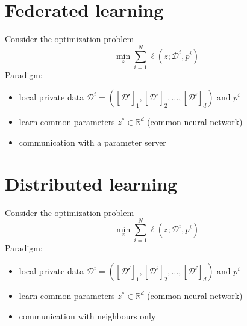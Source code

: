 \documentclass{book}
\newcommand{\R}{\mathbb{R}}
\theoremstyle{theoremv2}
\theoremstyle{defv2}
\theoremstyle{remark}
\theoremstyle{remark}
\theoremstyle{definition}
\theoremstyle{definition}
\begin{document}
\section{Federated learning}
Consider the optimization problem 
\[
    \min_z \displaystyle\sum_{i=1}^{N}\ell(z;\mathcal{D}^i,p^i)
\]
Paradigm:
\begin{itemize}
    \item local private data $\mathcal{D}^i = ([\mathcal{D^i}]_1,[\mathcal{D^i}]_2,\dots,[\mathcal{D^i}]_d)$ and $p^i$
    \item learn common parameters $z^*\in\R^d$ (common neural network)
    \item communication with a parameter server
\end{itemize}

\section{Distributed learning}
Consider the optimization problem 
\[
    \min_z \displaystyle\sum_{i=1}^{N}\ell(z;\mathcal{D}^i,p^i)
\]
Paradigm:
\begin{itemize}
    \item local private data $\mathcal{D}^i = ([\mathcal{D^i}]_1,[\mathcal{D^i}]_2,\dots,[\mathcal{D^i}]_d)$ and $p^i$
    \item learn common parameters $z^*\in\R^d$ (common neural network)
    \item communication with neighbours only
\end{itemize}
\end{document}

